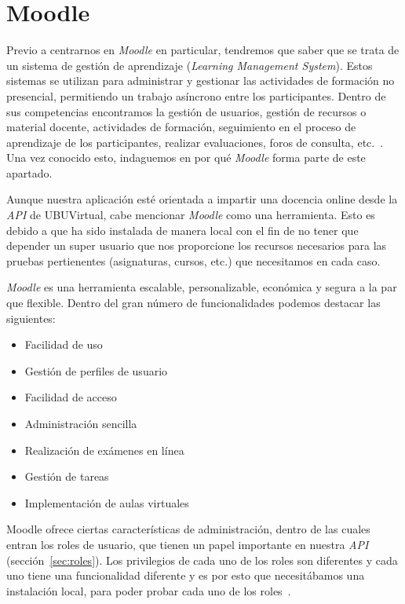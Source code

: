 
\section{Moodle}\label{sec:moodle-local}
Previo a centrarnos en \textit{Moodle} en particular, tendremos que saber que se trata de un sistema de gestión de aprendizaje (\textit{Learning Management System}). Estos sistemas se utilizan para administrar y gestionar las actividades de formación no presencial, permitiendo un trabajo asíncrono entre los participantes. Dentro de sus competencias encontramos la gestión de usuarios, gestión de recursos o material docente, actividades de formación, seguimiento en el proceso de aprendizaje de los participantes, realizar evaluaciones, foros de consulta, etc.~\cite{wiki:sistemaGestionAprendizaje}. Una vez conocido esto, indaguemos en por qué \textit{Moodle} forma parte de este apartado.

Aunque nuestra aplicación esté orientada a impartir una docencia online desde la \textit{API} de UBUVirtual, cabe mencionar \textit{Moodle} como una herramienta. Esto es debido a que ha sido instalada de manera local con el fin de no tener que depender un super usuario que nos proporcione los recursos necesarios para las pruebas pertienentes (asignaturas, cursos, etc.) que necesitamos en cada caso.

\textit{Moodle} es una herramienta escalable, personalizable, económica y segura a la par que flexible. Dentro del gran número de funcionalidades podemos destacar las siguientes:

\begin{itemize}
	\item Facilidad de uso
	\item Gestión de perfiles de usuario
	\item Facilidad de acceso
	\item Administración sencilla
	\item Realización de exámenes en línea
	\item Gestión de tareas
	\item Implementación de aulas virtuales
\end{itemize}

Moodle ofrece ciertas características de administración, dentro de las cuales entran los roles de usuario, que tienen un papel importante en nuestra \textit{API} (sección~\ref{sec:roles}). Los privilegios de cada uno de los roles son diferentes y cada uno tiene una funcionalidad diferente y es por esto que necesitábamos una instalación local, para poder probar cada uno de los roles~\cite{wiki:moodle}.


